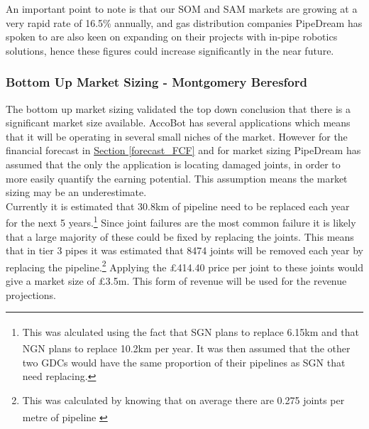 \documentclass[11pt]{article}		%
\newcommand{\supercite}[1]{\textsuperscript{\cite{#1}}}		%
\newcommand{\sectref}[1]{\hyperref[#1]{Section \ref*{#1}}}     %
\begin{document}
    An important point to note is that our SOM and SAM markets are growing at a very rapid rate of 16.5\% annually, and gas distribution companies PipeDream has spoken to are also keen on expanding on their projects with in-pipe robotics solutions, hence these figures could increase significantly in the near future.
    
    \subsubsection[Bottom Up Market Sizing]{Bottom Up Market Sizing - Montgomery Beresford} \label{bottomUp}
	  The bottom up market sizing validated the top down conclusion that there is a significant market size available.
	            AccoBot has several applications which means that it will be operating in several small niches of the market. However for the financial forecast in \sectref{forecast_FCF} and for market sizing PipeDream has assumed that  the only the application is locating damaged joints, in order to more easily quantify the earning potential. This assumption means the market sizing may be an underestimate.
	            \\ \hspace*{3ex}
		        Currently it is estimated that 30.8km of pipeline need to be replaced each year for the next 5 years.\footnote{ This was alculated using the fact that SGN plans to replace 6.15km \supercite{SGN_Southern}\supercite{SGN_Scotland} and that NGN plans to replace 10.2km per year\supercite{NGN_decisions}. It was then assumed that the other two GDCs would have the same proportion of their pipelines as SGN that need replacing.} Since joint failures are the most common failure it is likely that a large majority of these could be fixed by replacing the joints. This means that in tier 3 pipes it was estimated that 8474 joints will be removed each year by replacing the pipeline.\footnote{This was calculated by knowing that on average there are 0.275 joints per metre of pipeline \supercite{SGN_Southern}} %
		        Applying the £414.40 price per joint to these joints would give a market size of £3.5m. This form of revenue will be used for the revenue projections.
		        \\ \hspace*{3ex}
\end{document}
